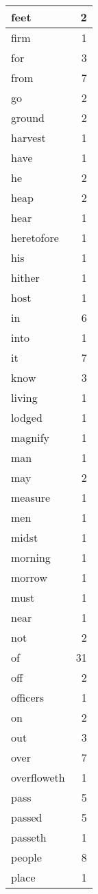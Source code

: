 \begin{center}
\begin{longtable}{l|r}
feet & 2 \\ \hline
firm & 1 \\ \hline
for & 3 \\ \hline
from & 7 \\ \hline
go & 2 \\ \hline
ground & 2 \\ \hline
harvest & 1 \\ \hline
have & 1 \\ \hline
he & 2 \\ \hline
heap & 2 \\ \hline
hear & 1 \\ \hline
heretofore & 1 \\ \hline
his & 1 \\ \hline
hither & 1 \\ \hline
host & 1 \\ \hline
in & 6 \\ \hline
into & 1 \\ \hline
it & 7 \\ \hline
know & 3 \\ \hline
living & 1 \\ \hline
lodged & 1 \\ \hline
magnify & 1 \\ \hline
man & 1 \\ \hline
may & 2 \\ \hline
measure & 1 \\ \hline
men & 1 \\ \hline
midst & 1 \\ \hline
morning & 1 \\ \hline
morrow & 1 \\ \hline
must & 1 \\ \hline
near & 1 \\ \hline
not & 2 \\ \hline
of & 31 \\ \hline
off & 2 \\ \hline
officers & 1 \\ \hline
on & 2 \\ \hline
out & 3 \\ \hline
over & 7 \\ \hline
overfloweth & 1 \\ \hline
pass & 5 \\ \hline
passed & 5 \\ \hline
passeth & 1 \\ \hline
people & 8 \\ \hline
place & 1 \\ \hline

\end{longtable}
\end{center}
